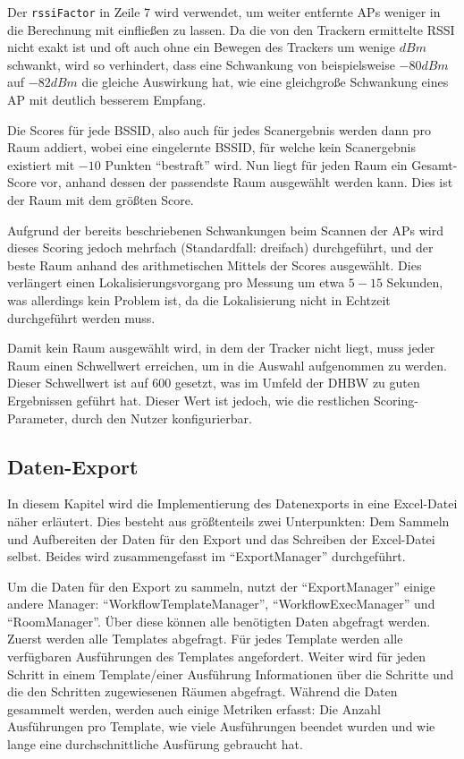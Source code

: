 Der \texttt{rssiFactor} in Zeile 7 wird verwendet, um weiter entfernte \glspl{AP} weniger in die
Berechnung mit einfließen zu lassen. Da die von den Trackern ermittelte \gls{RSSI} nicht exakt ist
und oft auch ohne ein Bewegen des Trackers um wenige $dBm$ schwankt, wird so verhindert, dass eine
Schwankung von beispielsweise $-80dBm$ auf $-82dBm$ die gleiche Auswirkung hat, wie eine gleichgroße
Schwankung eines \gls{AP} mit deutlich besserem Empfang.

Die Scores für jede \gls{BSSID}, also auch für jedes Scanergebnis werden dann pro Raum addiert,
wobei eine eingelernte \gls{BSSID}, für welche kein Scanergebnis existiert mit $-10$ Punkten
\enquote{bestraft} wird. Nun liegt für jeden Raum ein Gesamt-Score vor, anhand dessen der passendste
Raum ausgewählt werden kann. Dies ist der Raum mit dem größten Score.

Aufgrund der bereits beschriebenen Schwankungen beim Scannen der \glspl{AP} wird dieses Scoring
jedoch mehrfach (Standardfall: dreifach) durchgeführt, und der beste Raum anhand des arithmetischen
Mittels der Scores ausgewählt. Dies verlängert einen Lokalisierungsvorgang pro Messung um etwa
$5-15$ Sekunden, was allerdings kein Problem ist, da die Lokalisierung nicht in Echtzeit
durchgeführt werden muss.

Damit kein Raum ausgewählt wird, in dem der Tracker nicht liegt, muss jeder Raum einen Schwellwert
erreichen, um in die Auswahl aufgenommen zu werden. Dieser Schwellwert ist auf $600$ gesetzt, was im
Umfeld der \gls{DHBW} zu guten Ergebnissen geführt hat. Dieser Wert ist jedoch, wie die restlichen
Scoring-Parameter, durch den Nutzer konfigurierbar.

\subsection{Daten-Export}

In diesem Kapitel wird die Implementierung des Datenexports in eine Excel-Datei näher erläutert.
Dies besteht aus größtenteils zwei Unterpunkten: Dem Sammeln und Aufbereiten der Daten für den Export und das
Schreiben der Excel-Datei selbst.
Beides wird zusammengefasst im \enquote{ExportManager} durchgeführt.

Um die Daten für den Export zu sammeln, nutzt der \enquote{ExportManager} einige andere Manager:
\enquote{WorkflowTemplateManager}, \enquote{WorkflowExecManager} und \enquote{RoomManager}.
Über diese können alle benötigten Daten abgefragt werden.
Zuerst werden alle Templates abgefragt.
Für jedes Template werden alle verfügbaren Ausführungen des Templates angefordert.
Weiter wird für jeden Schritt in einem Template/einer Ausführung Informationen über die Schritte und die den Schritten
zugewiesenen Räumen abgefragt.
Während die Daten gesammelt werden, werden auch einige Metriken erfasst: Die Anzahl Ausführungen pro Template,
wie viele Ausführungen beendet wurden und wie lange eine durchschnittliche Ausfürung gebraucht hat.

